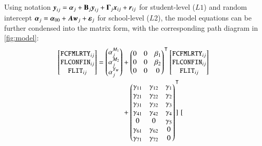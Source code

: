 Using  notation $\boldsymbol{y}_{ij} = \boldsymbol{\alpha}_j + \boldsymbol{\mathrm{B}}_j\boldsymbol{y}_{ij} + \boldsymbol{\Gamma}_j\boldsymbol{x}_{ij} + \boldsymbol{r}_{ij}$ for student-level ($L1$) and random intercept $\boldsymbol{\alpha}_{j} = \boldsymbol{\alpha}_{00} + \boldsymbol{A}\boldsymbol{w}_j + \boldsymbol{\varepsilon}_j$ for school-level ($L2$), the model equations can be further condensed into the matrix form, with the corresponding path diagram in \cref{fig:model}:
\begin{equation}
    \begin{aligned}
        \begin{bmatrix}
            \texttt{FCFMLRTY}_{ij}\\
            \texttt{FLCONFIN}_{ij}\\
            \texttt{FLIT}_{ij}
        \end{bmatrix} =
        \begin{pmatrix}
            \alpha^{M_1}_{j}\\
            \alpha^{M_2}_{j}\\
            \alpha^{Y_W}_{j}\\
        \end{pmatrix} &+
        \begin{pmatrix}
            0   &0  &\beta_1\\
            0   &0  &\beta_2\\
            0   &0  &0\\
        \end{pmatrix}\Ts
        \begin{bmatrix}
            \texttt{FCFMLRTY}_{ij}\\
            \texttt{FLCONFIN}_{ij}\\
            \texttt{FLIT}_{ij}
        \end{bmatrix}\\
        &+
        \begin{pmatrix}
            \gamma_{11}  &\gamma_{12}   &\gamma_1\\
            \gamma_{21}  &\gamma_{22}   &\gamma_2\\
            \gamma_{31}  &\gamma_{32}   &\gamma_3\\
            \gamma_{41}  &\gamma_{42}   &\gamma_4\\
            0  &0   &\gamma_5\\
            \gamma_{61}  &\gamma_{62}   &0\\
            \gamma_{71}  &\gamma_{72}   &0
        \end{pmatrix}\Ts
        \begin{bmatrix}

\end{bmatrix}
\end{aligned}
\end{equation}
